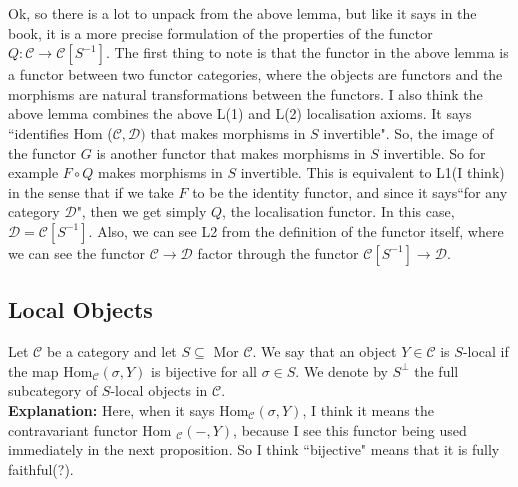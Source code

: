 \documentclass[12pt]{article}
\newcommand{\cat}[1]{\mathscr{#1}}
\begin{document}
 Ok, so there is a lot to unpack from the above lemma, but like it says in the book, it is a more precise formulation of the properties of the functor $Q: \cat{C} \to \cat{C}[S^{-1}]$. The first thing to note is that the functor in the above lemma is a functor between two functor categories, where the objects are functors and the morphisms are natural transformations between the functors. I also think the above lemma combines the above L(1) and L(2) localisation axioms. It says ``identifies Hom ($\cat{C,D})$ that makes morphisms in $S$ invertible". So, the image of the functor $G$ is another functor that makes morphisms in $S$ invertible. So for example $F \circ Q$ makes morphisms in $S$ invertible. This is equivalent to L1(I think) in the sense that if we take $F$ to be the identity functor, and since it says``for any category $\cat{D}$", then we get simply $Q$, the localisation functor. In this case, $\cat{D}=\cat{C}[S^{-1}]$. Also, we can see L2 from the definition of the functor itself, where we can see the functor $\cat{C} \to \cat{D}$ factor through the functor $\cat{C}[S^{-1}] \to \cat{D}$.
\begin{center}
 \subsection*{Local Objects}
\end{center}
Let $\cat{C}$ be a category and let $S \subseteq$ Mor $\cat{C}$. We say that an object $Y\in \cat{C}$ is $S$-local if the map Hom$_\cat{C}(\sigma,Y)$ is bijective for all $\sigma \in S$. We denote by $S^\perp$ the full subcategory of $S$-local objects in $\cat{C}$.\\


\textbf{Explanation: } Here, when it says Hom$_\cat{C}(\sigma,Y)$, I think it means the contravariant functor Hom $_\cat{C}( - ,Y)$, because I see this functor being used immediately in the next proposition. So I think ``bijective" means that it is fully faithful(?).
\end{document}

